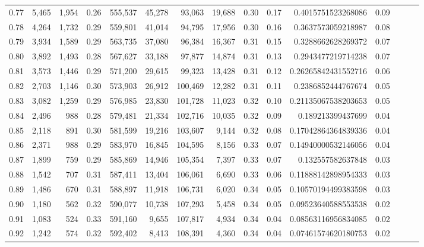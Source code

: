 \begin{tabular}{rrrrrrrrrrrrrrr}
0.77 &   5,465 &  1,954 &  0.26 &  555,537 &   45,278 &   93,063 &   19,688 &  0.30 &  0.17 &    0.4015751523268086 &      0.09 \\
0.78 &   4,264 &  1,732 &  0.29 &  559,801 &   41,014 &   94,795 &   17,956 &  0.30 &  0.16 &    0.3637573059218987 &      0.08 \\
0.79 &   3,934 &  1,589 &  0.29 &  563,735 &   37,080 &   96,384 &   16,367 &  0.31 &  0.15 &    0.3288662628269372 &      0.07 \\
0.80 &   3,892 &  1,493 &  0.28 &  567,627 &   33,188 &   97,877 &   14,874 &  0.31 &  0.13 &    0.2943477219714238 &      0.07 \\
0.81 &   3,573 &  1,446 &  0.29 &  571,200 &   29,615 &   99,323 &   13,428 &  0.31 &  0.12 &   0.26265842431552716 &      0.06 \\
0.82 &   2,703 &  1,146 &  0.30 &  573,903 &   26,912 &  100,469 &   12,282 &  0.31 &  0.11 &    0.2386852444767674 &      0.05 \\
0.83 &   3,082 &  1,259 &  0.29 &  576,985 &   23,830 &  101,728 &   11,023 &  0.32 &  0.10 &   0.21135067538203653 &      0.05 \\
0.84 &   2,496 &    988 &  0.28 &  579,481 &   21,334 &  102,716 &   10,035 &  0.32 &  0.09 &     0.189213399437699 &      0.04 \\
0.85 &   2,118 &    891 &  0.30 &  581,599 &   19,216 &  103,607 &    9,144 &  0.32 &  0.08 &   0.17042864364839336 &      0.04 \\
0.86 &   2,371 &    988 &  0.29 &  583,970 &   16,845 &  104,595 &    8,156 &  0.33 &  0.07 &   0.14940000532146056 &      0.04 \\
0.87 &   1,899 &    759 &  0.29 &  585,869 &   14,946 &  105,354 &    7,397 &  0.33 &  0.07 &     0.132557582637848 &      0.03 \\
0.88 &   1,542 &    707 &  0.31 &  587,411 &   13,404 &  106,061 &    6,690 &  0.33 &  0.06 &   0.11888142898954333 &      0.03 \\
0.89 &   1,486 &    670 &  0.31 &  588,897 &   11,918 &  106,731 &    6,020 &  0.34 &  0.05 &   0.10570194499383598 &      0.03 \\
0.90 &   1,180 &    562 &  0.32 &  590,077 &   10,738 &  107,293 &    5,458 &  0.34 &  0.05 &   0.09523640588553538 &      0.02 \\
0.91 &   1,083 &    524 &  0.33 &  591,160 &    9,655 &  107,817 &    4,934 &  0.34 &  0.04 &   0.08563116956834085 &      0.02 \\
0.92 &   1,242 &    574 &  0.32 &  592,402 &    8,413 &  108,391 &    4,360 &  0.34 &  0.04 &   0.07461574620180753 &      0.02 \\

\end{tabular}
